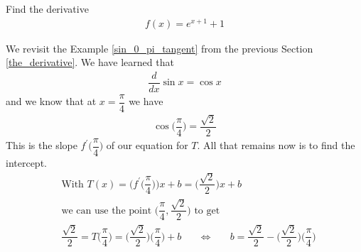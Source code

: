 \begin{exercise}
Find the derivative
\begin{align*}
    f(x) = e^{x+1} + 1
\end{align*}
\end{exercise}

\begin{example}
We revisit the Example \ref{sin_0_pi_tangent} from the previous Section \ref{the_derivative}. We have learned that
\begin{align*}
    \dfrac{d}{dx} \sin x = \cos x
\end{align*}
and we know that at $x = \dfrac{\pi}{4}$ we have
\begin{align*}
    \cos \Big(\dfrac{\pi}{4} \Big) = \dfrac{\sqrt{2}}{2}
\end{align*}
This is the slope $f^{'}\Big(\dfrac{\pi}{4}\Big)$ of our equation for $T$. All that remains now is to find the intercept. 
\begin{align*}
    &\text{With} \hspace{4pt} T(x) = \Big(f^{'}\Big(\dfrac{\pi}{4}\Big)\Big)x + b = \Big(\dfrac{\sqrt{2}}{2}\Big)x + b\\[2ex]
    &\text{we can use the point} \hspace{4pt} \Big(\dfrac{\pi}{4}, \dfrac{\sqrt{2}}{2}\Big) \hspace{4pt} \text{to get}\\[2ex] &\dfrac{\sqrt{2}}{2} = T\Big(\dfrac{\pi}{4}\Big) = \Big(\dfrac{\sqrt{2}}{2}\Big)\Big(\dfrac{\pi}{4}\Big) + b \hspace{20pt} \Longleftrightarrow \hspace{20pt} b = \dfrac{\sqrt{2}}{2} - \Big(\dfrac{\sqrt{2}}{2}\Big) \Big(\dfrac{\pi}{4}\Big)
\end{align*}

\end{example}


